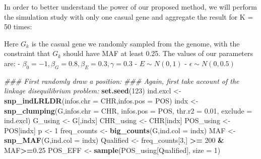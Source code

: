 \documentclass[
]{article}
\newenvironment{Shaded}{\begin{snugshade}}{\end{snugshade}}
\newcommand{\CommentTok}[1]{\textcolor[rgb]{0.56,0.35,0.01}{\textit{#1}}}
\newcommand{\DataTypeTok}[1]{\textcolor[rgb]{0.13,0.29,0.53}{#1}}
\newcommand{\DecValTok}[1]{\textcolor[rgb]{0.00,0.00,0.81}{#1}}
\newcommand{\FloatTok}[1]{\textcolor[rgb]{0.00,0.00,0.81}{#1}}
\newcommand{\KeywordTok}[1]{\textcolor[rgb]{0.13,0.29,0.53}{\textbf{#1}}}
\newcommand{\NormalTok}[1]{#1}
\newcommand{\OperatorTok}[1]{\textcolor[rgb]{0.81,0.36,0.00}{\textbf{#1}}}
\newcommand{\StringTok}[1]{\textcolor[rgb]{0.31,0.60,0.02}{#1}}
\begin{document}
In order to better understand the power of our proposed method, we will
perform the simulation study with only one casual gene and aggregate the
result for K = 50 times:

Here \(G_k\) is the casual gene we randomly sampled from the genome,
with the constraint that \(G_k\) should have MAF at least 0.25. The
values of our parameters are: -
\(\beta_0= -1, \beta_G=0.8, \beta_E= 0.3,\gamma=0.3\) -
\(E \sim N(0,1)\) - \(\epsilon \sim N(0,0.5)\)

\begin{Shaded}
\begin{Highlighting}[]
\CommentTok{### First randomly draw a position:}
\CommentTok{### Again, first take account of the linkage disequilibrium problem:}
\KeywordTok{set.seed}\NormalTok{(}\DecValTok{123}\NormalTok{)}
\NormalTok{ind.excl <-}\StringTok{ }\KeywordTok{snp_indLRLDR}\NormalTok{(}\DataTypeTok{infos.chr =}\NormalTok{ CHR,}\DataTypeTok{infos.pos =}\NormalTok{ POS)}
\NormalTok{indx <-}\StringTok{ }\KeywordTok{snp_clumping}\NormalTok{(G,}\DataTypeTok{infos.chr =}\NormalTok{ CHR, }\DataTypeTok{infos.pos =}\NormalTok{ POS, }\DataTypeTok{thr.r2 =} \FloatTok{0.01}\NormalTok{, }\DataTypeTok{exclude =}\NormalTok{ ind.excl)}
\NormalTok{G_using <-}\StringTok{ }\NormalTok{G[,indx]}
\NormalTok{CHR_using <-}\StringTok{ }\NormalTok{CHR[indx]}
\NormalTok{POS_using <-}\StringTok{ }\NormalTok{POS[indx]}
\NormalTok{p <-}\StringTok{ }\DecValTok{1}
\NormalTok{freq_counts <-}\StringTok{ }\KeywordTok{big_counts}\NormalTok{(G,}\DataTypeTok{ind.col =}\NormalTok{ indx)}
\NormalTok{MAF <-}\StringTok{ }\KeywordTok{snp_MAF}\NormalTok{(G,}\DataTypeTok{ind.col =}\NormalTok{ indx)}
\NormalTok{Qualified <-}\StringTok{ }\NormalTok{freq_counts[}\DecValTok{3}\NormalTok{,] }\OperatorTok{>=}\StringTok{ }\DecValTok{200} \OperatorTok{&}\StringTok{ }\NormalTok{MAF}\OperatorTok{>=}\FloatTok{0.25}
\NormalTok{POS_EFF <-}\StringTok{ }\KeywordTok{sample}\NormalTok{(POS_using[Qualified], }\DataTypeTok{size =} \DecValTok{1}\NormalTok{)}



\end{Highlighting}
\end{Shaded}
\end{document}
